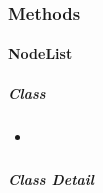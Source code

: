 \documentclass[letterpaper,10pt,english]{sphinxmanual}
\begin{document}
\subsubsection{Methods}
\label{api/core/node/index:methods}

\paragraph{NodeList}
\label{api/core/node/nodelist:nodelist}\label{api/core/node/nodelist::doc}

\subparagraph{Class}
\label{api/core/node/nodelist:class}\begin{itemize}
\item {}
{\hyperref[api/core/node/nodelist:Node.NodeList]{}}

\end{itemize}


\subparagraph{Class Detail}
\label{api/core/node/nodelist:class-detail}
\end{document}
